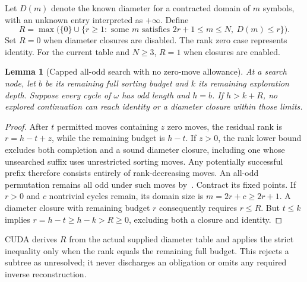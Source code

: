 \documentclass[11pt,a4paper]{article}
\newtheorem{lemma}{Lemma}
\begin{document}
Let $D(m)$ denote the known diameter for a contracted domain of $m$ symbols,
with an unknown entry interpreted as $+\infty$. Define
\[
 R=\max\bigl(\{0\}\cup
 \{r\geq1:\text{ some }m\text{ satisfies }2r+1\leq m\leq N,
                                      \ D(m)\leq r\}\bigr).
\]
Set $R=0$ when diameter closures are disabled. The rank zero case represents
identity. For the current table and $N\geq3$, $R=1$ when closures are enabled.

\begin{lemma}[Capped all-odd search with no zero-move allowance]
At a search node, let $b$ be its remaining full sorting budget and $k$ its
remaining exploration depth. Suppose every cycle of $\omega$ has odd length
and $h=b$. If $h>k+R$, no explored continuation can reach identity or a
diameter closure within those limits.
\end{lemma}
\begin{proof}
After $t$ permitted moves containing $z$ zero moves, the residual rank is
$r=h-t+z$, while the remaining budget is $h-t$. If $z>0$, the rank lower
bound excludes both completion and a sound diameter closure, including one
whose unsearched suffix uses unrestricted sorting moves. Any potentially
successful prefix therefore consists entirely of rank-decreasing moves.
An all-odd permutation remains all odd under such moves
by~\cite[Corollary 3.3 and Remark 3.5]{muhle-nadeau}.
Contract its fixed points. If $r>0$ and $c$ nontrivial cycles remain, its
domain size is $m=2r+c\geq2r+1$. A diameter closure with remaining budget
$r$ consequently requires $r\leq R$. But $t\leq k$ implies
$r=h-t\geq h-k>R\geq0$, excluding both a closure and identity.
\end{proof}

CUDA derives $R$ from the actual supplied diameter table and applies the
strict inequality only when the rank equals the remaining full budget.
This rejects a subtree as unresolved; it never discharges an obligation or
omits any required inverse reconstruction.
\end{document}
